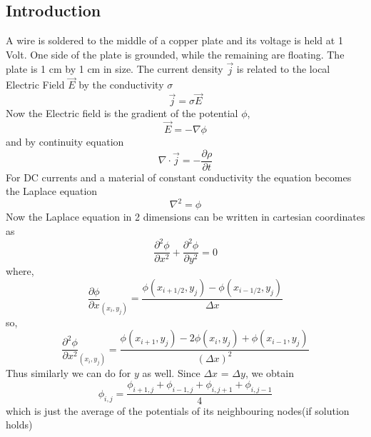 \documentclass[11pt, a4paper]{article}
\begin{document}
\subsection{Introduction}
    A wire is soldered to the middle of a copper plate and its voltage is held at 1 Volt. One side of the plate is grounded, while the remaining are floating. The plate is 1 cm by 1 cm in size. The current density $\Vec{j}$ is related to the local Electric Field $\Vec{E}$ by the conductivity $\sigma$
    \begin{equation*}
        \Vec{j} = \sigma\Vec{E}
    \end{equation*}
    Now the Electric field is the gradient of the potential $\phi$,
    \begin{equation*}
        \Vec{E} = -\nabla\phi
    \end{equation*}
    and by continuity equation
    \begin{equation*}
        \nabla\cdot\Vec{j} = -\frac{\partial \rho}{\partial t}
    \end{equation*}
    For DC currents and a material of constant conductivity the equation becomes the Laplace equation
    \begin{equation*}
        \nabla^{2} = \phi
    \end{equation*}
    Now the Laplace equation in 2 dimensions can be written in cartesian coordinates as
    \begin{equation*}
        \frac{\partial^2 \phi}{\partial x^2} + \frac{\partial^2 \phi}{\partial y^2} = 0
    \end{equation*}
    where,
    \begin{equation*}
        {\frac{\partial \phi}{\partial x}}_{(x_i,y_j)} = \frac{\phi(x_{i + 1/2},y_j) - \phi(x_{i - 1/2},y_j)}{\Delta x}
    \end{equation*}
    so,
    \begin{equation*}
        {\frac{\partial^2 \phi}{\partial x^2}}_{(x_i,y_j)} = \frac{\phi(x_{i + 1},y_j) - 2\phi(x_i,y_j) + \phi(x_{i - 1},y_j)}{(\Delta x)^2}
    \end{equation*}
    Thus similarly we can do for $y$ as well. Since $\Delta x$ = $\Delta y$, we obtain
    \begin{equation}
        \phi_{i,j} = \frac{\phi_{i+1,j} + \phi_{i-1,j} + \phi_{i,j+1} + \phi_{i,j-1}}{4}
    \end{equation}
    which is just the average of the potentials of its neighbouring nodes(if solution holds)
\end{document}
